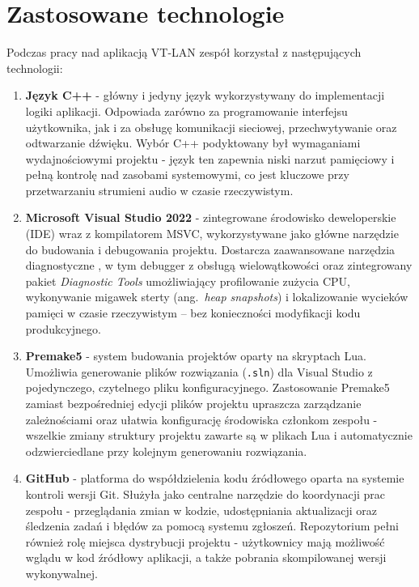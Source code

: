 \section{Zastosowane technologie}
\label{sec:technologie}
Podczas pracy nad aplikacją VT-LAN zespół korzystał z następujących technologii:
\begin{enumerate}
	\item \textbf{Język C++} - główny i jedyny język wykorzystywany do implementacji
	logiki aplikacji. Odpowiada zarówno za programowanie interfejsu użytkownika,
	jak i za obsługę komunikacji sieciowej, przechwytywanie oraz odtwarzanie dźwięku.
	Wybór C++ podyktowany był wymaganiami wydajnościowymi projektu - język ten
	zapewnia niski narzut pamięciowy i pełną kontrolę nad zasobami systemowymi,
	co jest kluczowe przy przetwarzaniu strumieni audio w czasie rzeczywistym.
	
	\item \textbf{Microsoft Visual Studio 2022} - zintegrowane środowisko deweloperskie
	(IDE) wraz z kompilatorem MSVC, wykorzystywane jako główne narzędzie do budowania
	i debugowania projektu. Dostarcza zaawansowane narzędzia diagnostyczne \cite{msvc_profiler},
	w tym debugger z obsługą wielowątkowości oraz zintegrowany pakiet \textit{Diagnostic Tools}
	umożliwiający profilowanie zużycia CPU, wykonywanie migawek sterty (ang.~\textit{heap
	snapshots}) i lokalizowanie wycieków pamięci w czasie rzeczywistym -- bez konieczności
	modyfikacji kodu produkcyjnego.
	
	\item \textbf{Premake5} - system budowania projektów oparty na skryptach Lua.
	Umożliwia generowanie plików rozwiązania (\texttt{.sln}) dla Visual Studio
	z pojedynczego, czytelnego pliku konfiguracyjnego. Zastosowanie Premake5
	zamiast bezpośredniej edycji plików projektu upraszcza zarządzanie zależnościami
	oraz ułatwia konfigurację środowiska członkom zespołu - wszelkie zmiany
	struktury projektu zawarte są w plikach Lua i automatycznie odzwierciedlane
	przy kolejnym generowaniu rozwiązania.
	
	\item \textbf{GitHub} - platforma do współdzielenia kodu źródłowego oparta na systemie
	kontroli wersji Git. Służyła jako centralne narzędzie do koordynacji prac zespołu
	- przeglądania zmian w kodzie, udostępniania aktualizacji oraz śledzenia zadań
	i błędów za pomocą systemu zgłoszeń. Repozytorium pełni również rolę miejsca
	dystrybucji projektu - użytkownicy mają możliwość wglądu w kod źródłowy aplikacji,
	a także pobrania skompilowanej wersji wykonywalnej.
	

\end{enumerate}
